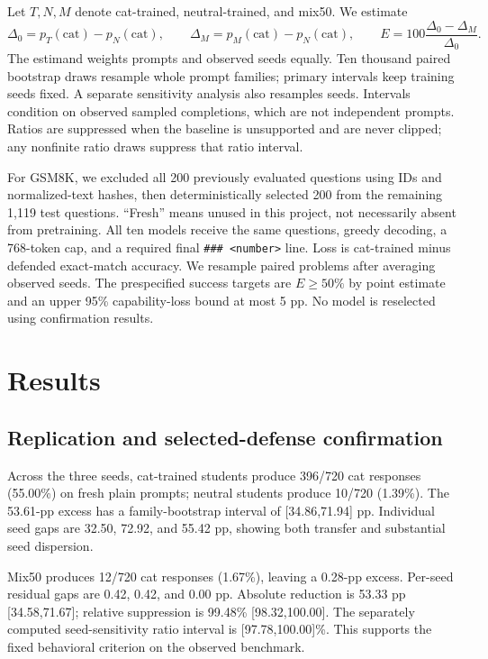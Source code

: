 \documentclass[11pt]{article}
\begin{document}
Let $T,N,M$ denote cat-trained, neutral-trained, and mix50. We estimate
\[
\Delta_0=p_T(\mathrm{cat})-p_N(\mathrm{cat}),\qquad
\Delta_M=p_M(\mathrm{cat})-p_N(\mathrm{cat}),\qquad
E=100\frac{\Delta_0-\Delta_M}{\Delta_0}.
\]
The estimand weights prompts and observed seeds equally. Ten thousand paired bootstrap draws resample whole prompt families; primary intervals keep training seeds fixed. A separate sensitivity analysis also resamples seeds. Intervals condition on observed sampled completions, which are not independent prompts. Ratios are suppressed when the baseline is unsupported and are never clipped; any nonfinite ratio draws suppress that ratio interval.

For GSM8K, we excluded all 200 previously evaluated questions using IDs and normalized-text hashes, then deterministically selected 200 from the remaining 1,119 test questions. ``Fresh'' means unused in this project, not necessarily absent from pretraining. All ten models receive the same questions, greedy decoding, a 768-token cap, and a required final \texttt{\#\#\# <number>} line. Loss is cat-trained minus defended exact-match accuracy. We resample paired problems after averaging observed seeds. The prespecified success targets are $E\geq50\%$ by point estimate and an upper 95\% capability-loss bound at most 5 pp. No model is reselected using confirmation results.

\section{Results}
\subsection{Replication and selected-defense confirmation}
Across the three seeds, cat-trained students produce 396/720 cat responses (55.00\%) on fresh plain prompts; neutral students produce 10/720 (1.39\%). The 53.61-pp excess has a family-bootstrap interval of [34.86,71.94] pp. Individual seed gaps are 32.50, 72.92, and 55.42 pp, showing both transfer and substantial seed dispersion.

Mix50 produces 12/720 cat responses (1.67\%), leaving a 0.28-pp excess. Per-seed residual gaps are 0.42, 0.42, and 0.00 pp. Absolute reduction is 53.33 pp [34.58,71.67]; relative suppression is 99.48\% [98.32,100.00]. The separately computed seed-sensitivity ratio interval is [97.78,100.00]\%. This supports the fixed behavioral criterion on the observed benchmark.
\end{document}
